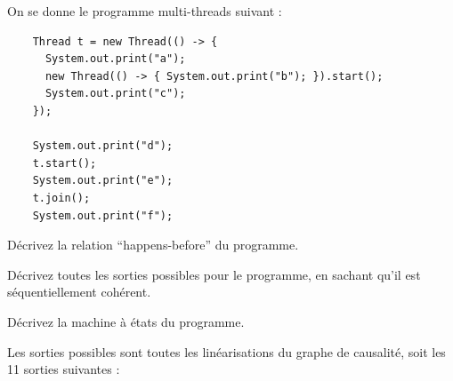 
\begingroup

\begin{exercice}[Asynchronie]
  \label{exo:introduction/asynchronous}

  On se donne le programme multi-threads suivant : 

  \begin{lstlisting}
    Thread t = new Thread(() -> {
      System.out.print("a");
      new Thread(() -> { System.out.print("b"); }).start();
      System.out.print("c");
    });

    System.out.print("d");
    t.start();
    System.out.print("e");
    t.join();
    System.out.print("f");
  \end{lstlisting}

  \begin{question}
  \item Décrivez la relation ``happens-before'' du programme.
  \item Décrivez toutes les sorties possibles pour le programme, en sachant qu'il est séquentiellement cohérent.
  \item Décrivez la machine à états du programme.
  \end{question}

  \begin{correction}
    Les sorties possibles sont toutes les linéarisations du graphe de causalité, soit les 11 sorties suivantes :
    
    \begin{minipage}{.4\textwidth}
\end{minipage}
\end{correction}
\end{exercice}
